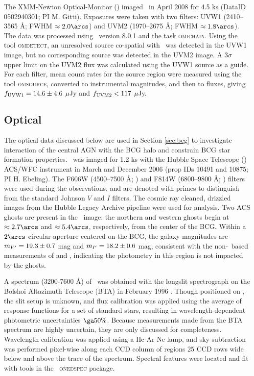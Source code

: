 \documentclass[iop]{emulateapj}
\begin{document}
The XMM-Newton Optical-Monitor (\xom) imaged \rbs\ in April 2008 for
4.5 ks (DataID 0502940301; PI M. Gitti). Exposures were taken with two
filters: UVW1 (2410--3565 \AA; FWHM $\approx 2.0\arcs$) and UVM2
(1970--2675 \AA; FWHM $\approx 1.8\arcs$). The data was processed
using \sas\ version 8.0.1 and the task {\textsc{omichain}}. Using the
tool {\textsc{omdetect}}, an unresolved source co-spatial with
\rbs\ was detected in the UVW1 image, but no corresponding source was
detected in the UVM2 image. A $3\sigma$ upper limit on the UVM2 flux
was calculated using the UVW1 source as a guide. For each filter, mean
count rates for the source region were measured using the tool
{\textsc{omsource}}, converted to instrumental magnitudes, and then to
fluxes, giving $f_{\rm{UVW1}} = 14.6 \pm 4.6$ $\mu$Jy and
$f_{\rm{UVM2}} < 117$ $\mu$Jy.

\subsection{Optical}

The optical data discussed below are used in Section \ref{sec:bcg} to
investigate interaction of the central AGN with the BCG halo and
constrain BCG star formation properties. \rbs\ was imaged for 1.2 ks
with the Hubble Space Telescope (\hst) ACS/WFC instrument in March and
December 2006 (prop IDs 10491 and 10875; PI H. Ebeling). The F606W
(4500--7500 \AA; \myv) and F814W (6800--9800 \AA; \myi) filters were
used during the observations, and are denoted with primes to
distinguish from the standard Johnson $V$ and $I$ filters. The cosmic
ray cleaned, drizzled images from the Hubble Legacy Archive pipeline
were used for analysis. Two ACS ghosts \citep{acsghost} are present in
the \myi\ image: the northern and western ghosts begin at $\approx
2.7\arcs$ and $\approx 5.4\arcs$, respectively, from the center of the
BCG. Within a $2\arcs$ circular aperture centered on the BCG, the
galaxy magnitudes are $m_{V^{\prime}} = 19.3 \pm 0.7$ mag and $m_{I^{\prime}} =
18.2 \pm 0.6$ mag, consistent with the non-\hst\ based measurements of
\citet{rbs1} and \citet{rbs2}, indicating the photometry in this
region is not impacted by the ghosts.

A spectrum (3200-7600 \AA) of \rbs\ was obtained with the longslit
spectrograph on the Bolshoi Altazimuth Telescope (BTA) in February
1996 \citep{rbs1, rbs2}. Though positioned on \rbs, the slit setup is
unknown, and flux calibration was applied using the average of
response functions for a set of standard stars, resulting in
wavelength-dependent photometric uncertainties $\ga 50\%$. Because
measurements made from the BTA spectrum are highly uncertain, they are
only discussed for completeness. Wavelength calibration was applied
using a He-Ar-Ne lamp, and sky subtraction was performed pixel-wise
along each CCD column of regions 25 CCD rows wide below and above the
trace of the spectrum. Spectral features were located and fit with
tools in the \iraf\ {\textsc{onedspec}} package.
\end{document}
